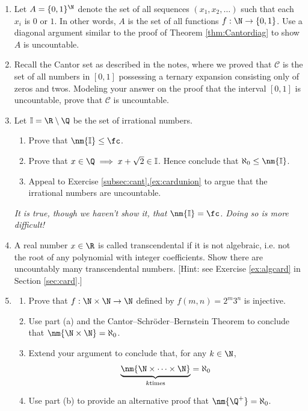 \begin{enumerate}
  	\item Let $A = \{0,1\}^\N$ denote the set of all sequences $(x_1,x_2,\ldots)$ such that each $x_i$ is $0$ or $1$. In other words, $A$ is the set of all functions $f : \N \to \{0,1\}$. Use a diagonal argument similar to the proof of Theorem \ref{thm:Cantordiag} to show $A$ is uncountable.
  
	\item Recall the Cantor set as described in the notes, where we proved that $\mathcal C$ is the set of all numbers in $[0,1]$ possessing a ternary expansion consisting only of zeros and twos. Modeling your answer on the proof that the interval $[0,1]$ is uncountable, prove that $\mathcal C$ is uncountable.
	
	\item Let $\mathbb I=\R\setminus\Q$ be the set of irrational numbers.
	\begin{enumerate}
	  \item Prove that $\nm{\mathbb I}\le\fc$.
	  \item Prove that $x\in\Q\implies x+\sqrt 2\in\mathbb I$. Hence conclude that $\aleph_0\le\nm{\mathbb I}$.
	  \item Appeal to Exercise \hyperref[ex:cardunion]{\ref*{subsec:cant}.\ref*{ex:cardunion}} to argue that the irrational numbers are uncountable.
 	\end{enumerate}
 	\emph{It is true, though we haven't show it, that $\nm{\mathbb I}=\fc$. Doing so is more difficult!}
 	
 	  \item A real number $x \in \R$ is called transcendental if it is not algebraic, i.e. not the root of any polynomial with integer coefficients. Show there are uncountably many transcendental numbers. [Hint: see Exercise \ref{ex:algcard} in Section \ref{sec:card}.]
  	
 	\item\begin{enumerate}
  		\item Prove that $f:\N\times\N\to\N$ defined by $f(m,n)=2^m3^n$ is injective.
  		\item Use part (a) and the Cantor--Schr\"oder--Bernstein Theorem to conclude that $\nm{\N\times\N}=\aleph_0$.
  		\item Extend your argument to conclude that, for any $k\in\N$,
  		\[\underbrace{\nm{\N\times\cdots\times\N}}_{k\text{times}}=\aleph_0\]
  		\item Use part (b) to provide an alternative proof that $\nm{\Q^+}=\aleph_0$.
  	\end{enumerate}
	

\end{enumerate}
